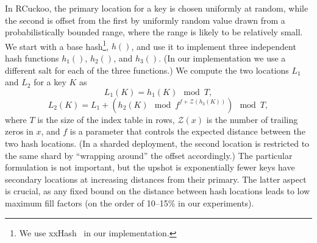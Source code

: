 \label{sec:dephash}







In RCuckoo, the primary location for a key is chosen uniformly at random,
while the second is offset from the first by 
uniformly random value drawn from a probabilistically bounded range, where the
range is likely to be relatively small.  We start with a base
hash\footnote{We use xxHash~\cite{xxhash} in our implementation.},
$h()$, and use it to implement three independent hash functions
$h_1()$, $h_2()$, and $h_3()$.  (In our implementation we use a
different salt for each of the three functions.)  We compute the two
locations $L_1$ and $L_2$ for a key $K$ as
\[ L_1(K) = h_1(K)\mod T, \]
\[ L_2(K) = L_1 + (h_2(K)\mod f^{f+\mathcal{Z}(h_3(K))})\mod T, \]
\noindent where $T$ is the size of the index table in rows,
$\mathcal{Z}(x)$ is the number of trailing zeros in $x$, and $f$ is a
parameter that controls the expected distance between the two hash
locations.  (In a sharded deployment, the second location is
restricted to the same shard by ``wrapping around'' the offset
accordingly.) The particular formulation is not important, but the
upshot is exponentially fewer keys have secondary locations at
increasing distances from their primary.  The latter aspect is crucial, as any
fixed bound on the distance between hash locations leads to low
maximum fill factors (on the order of 10--15\% in our experiments).

